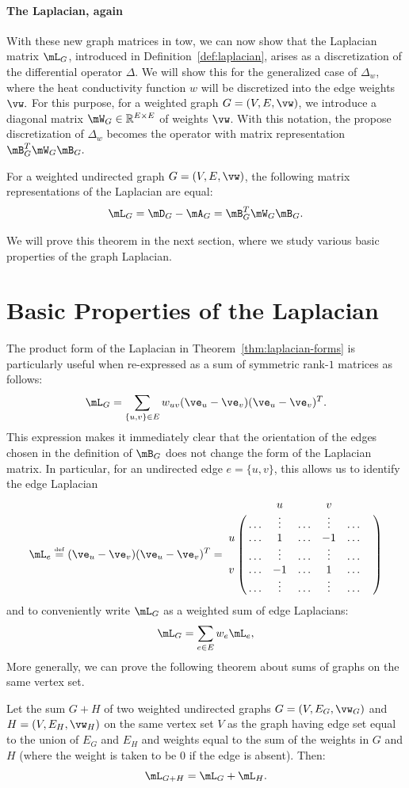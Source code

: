 \paragraph{The Laplacian, again} 
With these new graph matrices in tow, we can now show that the Laplacian matrix $\mL_G$, introduced in Definition~\ref{def:laplacian}, arises as a discretization of the differential operator $\Delta$. We will show this for the generalized case of $\Delta_w$, where the heat conductivity function $w$ will be discretized into the edge weights $\vw.$
For this purpose, for a weighted graph $G=(V,E, \vw)$, we introduce a diagonal matrix $\mW_G \in \R^{E \times E}$ of weights $\vw$. With this notation, the propose discretization of $\Delta_w$ becomes the operator with matrix representation $\mB_G^T \mW_G \mB_G.$

\begin{theorem} \label{thm:laplacian-forms}
For a weighted undirected graph $G=(V,E, \vw)$, the following matrix representations of the Laplacian are equal:
$$\mL_G = \mD_G - \mA_G = \mB_G^T \mW_G \mB_G.$$
\end{theorem}
We will prove this theorem in the next section, where we study various basic properties of the graph Laplacian.

\section{Basic Properties of the Laplacian}

The product form of the Laplacian in Theorem~\ref{thm:laplacian-forms} is particularly useful when re-expressed as a sum of symmetric rank-$1$ matrices as follows:
%
\begin{equation}\label{eq:exterior-laplacian}
\mL_G = \sum_{\{u,v\} \in E} w_{uv} (\ve_u - \ve_v)(\ve_u - \ve_v)^T.
\end{equation}
%
This expression makes it immediately clear that the orientation of the edges chosen in the definition of $\mB_G$ does not change the form of the Laplacian matrix. 
In particular, for an undirected edge $e = \{u,v\}$, this allows us to identify the edge Laplacian 
$$
\mL_e \defeq (\ve_u - \ve_v)(\ve_u - \ve_v)^T =  \bordermatrix{    & & u & & v& &\cr
                        & \ldots & \vdots & \ldots  & \vdots & \ldots &\cr
                       u & \ldots & 1 & \ldots &-1 & \ldots &\cr
                        & \ldots & \vdots &\ldots & \vdots &\ldots &\cr
                       v  & \ldots &-1 &\ldots & 1 & \ldots &\cr
                        & \ldots & \vdots &\ldots & \vdots &\ldots &\cr
}
$$
and to conveniently write $\mL_G$ as a weighted sum of edge Laplacians:
$$
\mL_G = \sum_{e \in E} w_e \mL_e,
$$
More generally, we can prove the following theorem about sums of graphs on the same vertex set.
\begin{theorem}
Let the sum $G+H$ of two weighted undirected graphs $G=(V, E_G, \vw_G)$ and $H=(V,E_H,\vw_H)$ on the same vertex set $V$ as the graph having edge set equal to the union of $E_G$ and $E_H$ and weights equal to the sum of the weights in $G$ and $H$ (where the weight is taken to be $0$ if the edge is absent). Then:
$$
\mL_{G+H} = \mL_G + \mL_H.
$$
\end{theorem}

